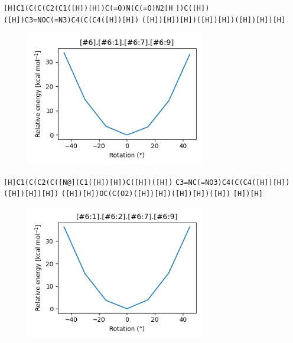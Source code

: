 \documentclass{beamer}
\begin{document}
\begin{frame}[fragile]
\verb|[H]C1(C(C(C2(C1([H])[H])C(=O)N(C(=O)N2[H|
\verb|])C([H])([H])C3=NOC(=N3)C4(C(C4([H])[H])|
\verb|([H])[H])[H])([H])[H])([H])[H])[H]|

\begin{figure}
    \includegraphics[width=0.7\textwidth,height=0.7\textheight,keepaspectratio]{plot04.png}
\end{figure}
\end{frame}
\begin{frame}[fragile]
\verb|[H]C1(C(C2(C([N@](C1([H])[H])C([H])([H])|
\verb|C3=NC(=NO3)C4(C(C4([H])[H])([H])[H])[H])|
\verb|([H])[H])OC(C(O2)([H])[H])([H])[H])([H])|
\verb|[H])[H]|

\begin{figure}
    \includegraphics[width=0.7\textwidth,height=0.7\textheight,keepaspectratio]{plot05.png}
\end{figure}
\end{frame}
\end{document}
